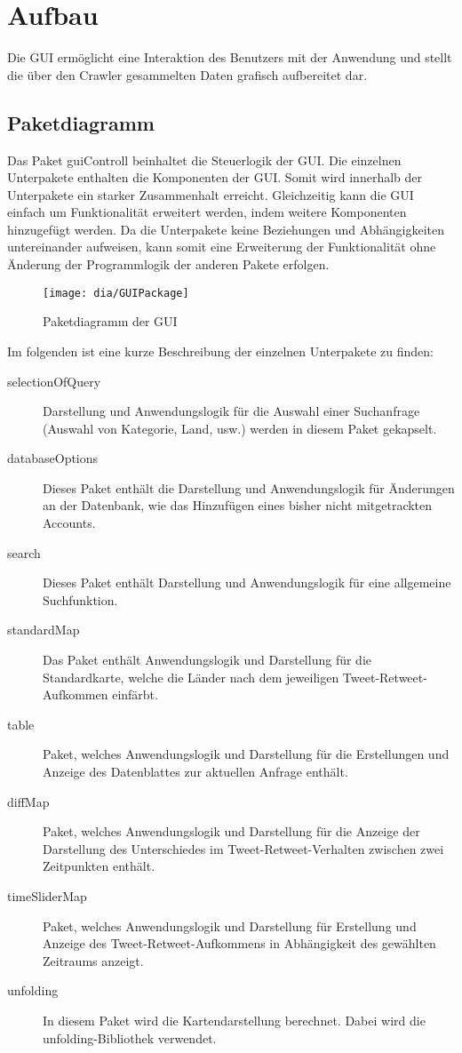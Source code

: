 \section{Aufbau}
Die GUI ermöglicht eine Interaktion des Benutzers mit der Anwendung und stellt die über den Crawler gesammelten Daten grafisch aufbereitet dar.\\
\subsection{Paketdiagramm}
Das Paket {guiControll} beinhaltet die Steuerlogik der GUI. Die einzelnen Unterpakete enthalten die Komponenten der GUI. Somit wird innerhalb der Unterpakete ein starker Zusammenhalt erreicht. Gleichzeitig kann die GUI einfach um Funktionalität erweitert werden, indem weitere Komponenten hinzugefügt werden. Da die Unterpakete keine Beziehungen und Abhängigkeiten untereinander aufweisen, kann somit eine Erweiterung der Funktionalität ohne Änderung der Programmlogik der anderen Pakete erfolgen. 
\begin{figure}[h!]
	\centering
	\texttt{[image: dia/GUIPackage]}
	\caption{Paketdiagramm der GUI}
	\label{fig:GUI}
\end{figure}


Im folgenden ist eine kurze Beschreibung der einzelnen Unterpakete zu finden:
\begin{description}
		\item [selectionOfQuery] Darstellung und Anwendungslogik für die Auswahl einer Suchanfrage (Auswahl von Kategorie, Land, usw.) werden in diesem Paket gekapselt.
		\item[databaseOptions] Dieses Paket enthält die Darstellung und Anwendungslogik für Änderungen an der Datenbank, wie das Hinzufügen eines bisher nicht mitgetrackten Accounts.
		\item[search] Dieses Paket enthält Darstellung und Anwendungslogik für eine allgemeine Suchfunktion.
		\item [standardMap] Das Paket enthält Anwendungslogik und Darstellung für die Standardkarte, welche die Länder nach dem jeweiligen Tweet-Retweet-Aufkommen einfärbt.
		\item [table] Paket, welches Anwendungslogik und Darstellung für die Erstellungen und Anzeige des Datenblattes zur aktuellen Anfrage enthält.
		\item[diffMap] Paket, welches Anwendungslogik und Darstellung für die Anzeige der Darstellung des Unterschiedes im Tweet-Retweet-Verhalten zwischen zwei Zeitpunkten enthält.
		\item [timeSliderMap] Paket, welches Anwendungslogik und Darstellung für Erstellung und Anzeige des Tweet-Retweet-Aufkommens in Abhängigkeit des gewählten Zeitraums anzeigt.
		\item [unfolding] In diesem Paket wird die Kartendarstellung berechnet. Dabei wird die unfolding-Bibliothek verwendet.
		
\end{description}

